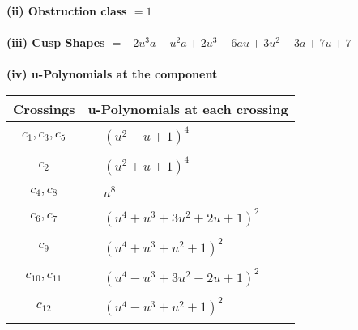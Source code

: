 \documentclass[1p]{elsarticle_modified}
\theoremstyle{definition}
\begin{document}
\flushleft \textbf{(ii) Obstruction class $= 1$}\\~\\
\flushleft \textbf{(iii) Cusp Shapes $= -2 u^3 a- u^2 a+2 u^3-6 a u+3 u^2-3 a+7 u+7$}\\~\\
\newpage\renewcommand{\arraystretch}{1}
\flushleft \textbf{(iv) u-Polynomials at the component}\newline \\
\begin{tabular}{m{50pt}|m{274pt}}
Crossings & \hspace{64pt}u-Polynomials at each crossing \\
\hline $$\begin{aligned}c_{1},c_{3},c_{5}\end{aligned}$$&$\begin{aligned}
&(u^2- u+1)^4
\end{aligned}$\\
\hline $$\begin{aligned}c_{2}\end{aligned}$$&$\begin{aligned}
&(u^2+u+1)^4
\end{aligned}$\\
\hline $$\begin{aligned}c_{4},c_{8}\end{aligned}$$&$\begin{aligned}
&u^8
\end{aligned}$\\
\hline $$\begin{aligned}c_{6},c_{7}\end{aligned}$$&$\begin{aligned}
&(u^4+u^3+3 u^2+2 u+1)^2
\end{aligned}$\\
\hline $$\begin{aligned}c_{9}\end{aligned}$$&$\begin{aligned}
&(u^4+u^3+u^2+1)^2
\end{aligned}$\\
\hline $$\begin{aligned}c_{10},c_{11}\end{aligned}$$&$\begin{aligned}
&(u^4- u^3+3 u^2-2 u+1)^2
\end{aligned}$\\
\hline $$\begin{aligned}c_{12}\end{aligned}$$&$\begin{aligned}
&(u^4- u^3+u^2+1)^2
\end{aligned}$\\
\hline
\end{tabular}\\~\\
\end{document}
